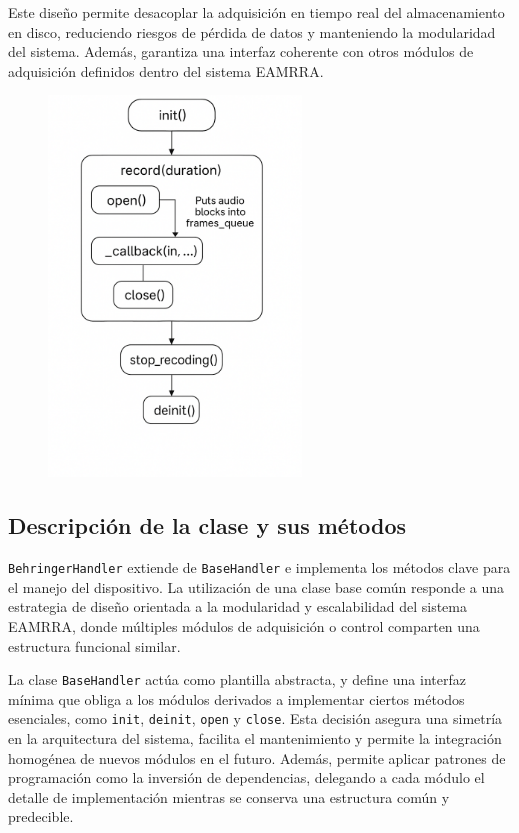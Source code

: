 Este diseño permite desacoplar la adquisición en tiempo real del almacenamiento en disco, reduciendo riesgos de pérdida de datos y manteniendo la modularidad del sistema. Además, garantiza una interfaz coherente con otros módulos de adquisición definidos dentro del sistema EAMRRA.

\begin{figure}[htpb]
    \centering
    \includegraphics[width=0.6\textwidth]{graficos/workflow.png}
    \label{fig:workflow}
\end{figure}




\subsection{Descripción de la clase y sus métodos}

\texttt{BehringerHandler} extiende de \texttt{BaseHandler} e implementa los métodos clave para el manejo del dispositivo. La utilización de una clase base común responde a una estrategia de diseño orientada a la modularidad y escalabilidad del sistema EAMRRA, donde múltiples módulos de adquisición o control comparten una estructura funcional similar. 

La clase \texttt{BaseHandler} actúa como plantilla abstracta, y define una interfaz mínima que obliga a los módulos derivados a implementar ciertos métodos esenciales, como \texttt{init}, \texttt{deinit}, \texttt{open} y \texttt{close}. Esta decisión asegura una simetría en la arquitectura del sistema, facilita el mantenimiento y permite la integración homogénea de nuevos módulos en el futuro. Además, permite aplicar patrones de programación como la inversión de dependencias, delegando a cada módulo el detalle de implementación mientras se conserva una estructura común y predecible.

